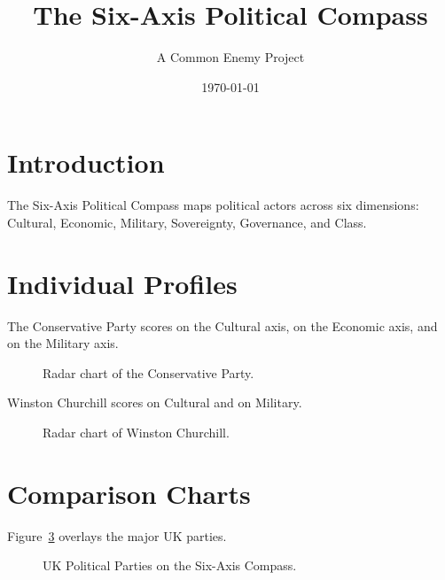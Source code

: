 \documentclass[11pt,a4paper]{article}
\title{The Six-Axis Political Compass}
\author{A Common Enemy Project}
\date{\today}
\begin{document}
\maketitle

\section{Introduction}

The Six-Axis Political Compass maps political actors across six dimensions:
Cultural, Economic, Military, Sovereignty, Governance, and Class.

\section{Individual Profiles}

The Conservative Party scores
\ConservativePartyCultural{} on the Cultural axis,
\ConservativePartyEconomic{} on the Economic axis, and
\ConservativePartyMilitary{} on the Military axis.

\begin{figure}[h]
  \centering
  
  \caption{Radar chart of the Conservative Party.}
  \label{fig:conservative}
\end{figure}

Winston Churchill scores
\WinstonChurchillCultural{} on Cultural and
\WinstonChurchillMilitary{} on Military.

\begin{figure}[h]
  \centering
  
  \caption{Radar chart of Winston Churchill.}
  \label{fig:churchill}
\end{figure}

\section{Comparison Charts}

Figure~\ref{fig:uk-parties} overlays the major UK parties.

\begin{figure}[h]
  \centering
  
  \caption{UK Political Parties on the Six-Axis Compass.}
  \label{fig:uk-parties}
\end{figure}
\end{document}
